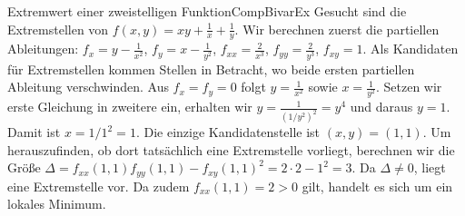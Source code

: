 \begin{example}{Extremwert einer zweistelligen Funktion}{CompBivarEx}
    Gesucht sind die Extremstellen von $f(x,y) = xy + \frac{1}{x} + \frac{1}{y}$. Wir berechnen zuerst die partiellen Ableitungen: $f_x = y-\frac{1}{x^2}$, $f_y = x-\frac{1}{y^2}$, $f_{xx} = \frac{2}{x^3}$, $f_{yy} = \frac{2}{y^3}$, $f_{xy} = 1$. Als Kandidaten für Extremstellen kommen Stellen in Betracht, wo beide ersten partiellen Ableitung verschwinden. Aus $f_x = f_y = 0$ folgt $y=\frac{1}{x^2}$ sowie $x=\frac{1}{y^2}$. Setzen wir erste Gleichung in zweitere ein, erhalten wir $y=\frac{1}{\left(1/y^2\right)^2} = y^4$ und daraus $y=1$. Damit ist $x=1/1^2 = 1$. Die einzige Kandidatenstelle ist $(x,y) =(1,1)$. Um herauszufinden, ob dort tatsächlich eine Extremstelle vorliegt, berechnen wir die Größe $\Delta = f_{xx}(1,1)f_{yy}(1,1) - f_{xy}(1,1)^2 = 2\cdot2 - 1^2 = 3$. Da $\Delta \ne 0$, liegt eine Extremstelle vor. Da zudem $f_{xx}(1,1) = 2 > 0$ gilt, handelt es sich um ein lokales Minimum.
\end{example}
